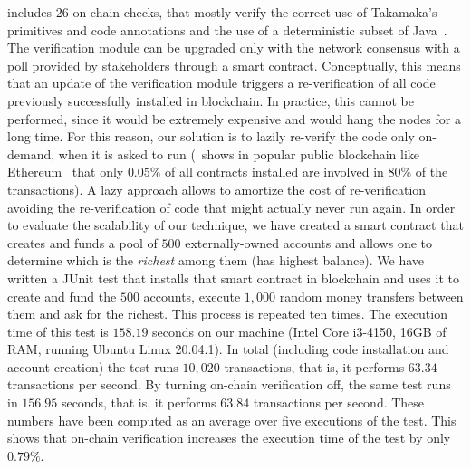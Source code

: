 \documentclass{easychair}
\begin{document}
  includes $26$ on-chain checks, that mostly verify the correct use of Takamaka's primitives and code annotations and the use of a deterministic subset of Java~\cite{Spoto20}.
  The verification module can be upgraded only with the network consensus with a poll provided by stakeholders through a smart contract. 
  Conceptually, this means that an update of the verification module triggers a re-verification of all code previously successfully installed in blockchain. 
  In practice, this cannot be performed, since it would be extremely expensive and would hang the nodes for a long time. For this reason, our solution is to lazily 
  re-verify the code only on-demand, when it is asked to run (\cite{OlivaHJ20}~shows in popular public blockchain like Ethereum~\cite{Buterin13} that
  only $0.05\%$ of all contracts installed are involved in $80\%$ of the transactions). A lazy approach allows to amortize the cost of re-verification 
  avoiding the re-verification of code that might actually never run again.
  In order to evaluate the scalability of our technique, we have created a smart contract
  that creates and funds a pool of $500$ externally-owned
  accounts and allows one to determine which is the \emph{richest} among them (has highest balance).
  We have written a JUnit test that installs that smart contract in blockchain and
  uses it to create and fund the $500$ accounts, execute $1,000$
  random money transfers between them and ask for the richest. This process is repeated
  ten times. The execution time of this test
  is $158.19$ seconds on our machine (Intel Core i3-4150, 16GB of RAM, running Ubuntu Linux 20.04.1).
  In total (including code installation and account creation) the test runs $10,020$ transactions,
  that is, it performs $63.34$ transactions per second.
  By turning on-chain verification off, the same test runs in $156.95$ seconds, that is,
  it performs $63.84$ transactions per second.
  These numbers have been computed as an average over five executions of the test.
  This shows that on-chain verification increases the execution time of the test by only $0.79\%$.
  


\end{document}
